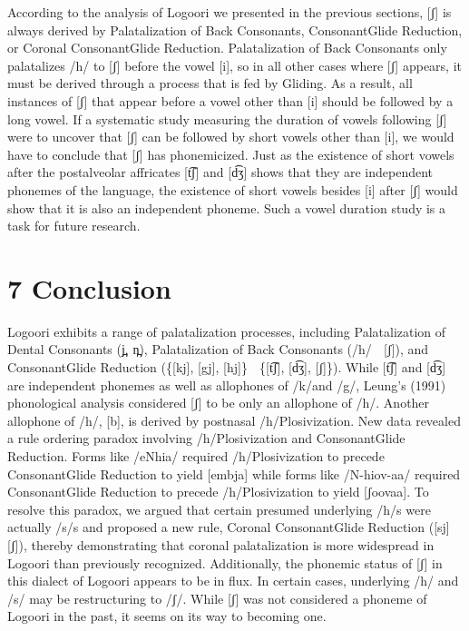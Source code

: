 According to the analysis of Logoori we presented in the previous sections, [ʃ] is always derived by Palatalization of Back Consonants, ConsonantGlide Reduction, or Coronal ConsonantGlide Reduction. Palatalization of Back Consonants only palatalizes /h/ to [ʃ] before the vowel [i], so in all other cases where [ʃ] appears, it must be derived through a process that is fed by Gliding. As a result, all instances of [ʃ] that appear before a vowel other than [i] should be followed by a long vowel. If a systematic study measuring the duration of vowels following [ʃ] were to uncover that [ʃ] can be followed by short vowels other than [i], we would have to conclude that [ʃ] has phonemicized. Just as the existence of short vowels after the postalveolar affricates [t͡ʃ] and [d͡ʒ] shows that they are independent phonemes of the language, the existence of short vowels besides [i] after [ʃ] would show that it is also an independent phoneme. Such a vowel duration study is a task for future research.

\chapter{7 Conclusion}

Logoori exhibits a range of palatalization processes, including Palatalization of Dental Consonants (j̪, n̪), Palatalization of Back Consonants (/h/  [ʃ]), and ConsonantGlide Reduction (\{[kj], [gj], [hj]\}  \{[t͡ʃ], [d͡ʒ], [ʃ]\}). While [t͡ʃ] and [d͡ʒ] are independent phonemes as well as allophones of /k/and /g/, Leung’s (1991) phonological analysis considered [ʃ] to be only an allophone of /h/. Another allophone of /h/, [b], is derived by postnasal /h/Plosivization. New data revealed a rule ordering paradox involving /h/Plosivization and ConsonantGlide Reduction. Forms like /eNhia/ required /h/Plosivization to precede ConsonantGlide Reduction to yield [embja] while forms like /N-hiov-aa/ required ConsonantGlide Reduction to precede /h/Plosivization to yield [ʃoovaa]. To resolve this paradox, we argued that certain presumed underlying /h/s were actually /s/s and proposed a new rule, Coronal ConsonantGlide Reduction ([sj]  [ʃ]), thereby demonstrating that coronal palatalization is more widespread in Logoori than previously recognized. Additionally, the phonemic status of [ʃ] in this dialect of Logoori appears to be in flux. In certain cases, underlying /h/ and /s/ may be restructuring to /ʃ/. While [ʃ] was not considered a phoneme of Logoori in the past, it seems on its way to becoming one.

